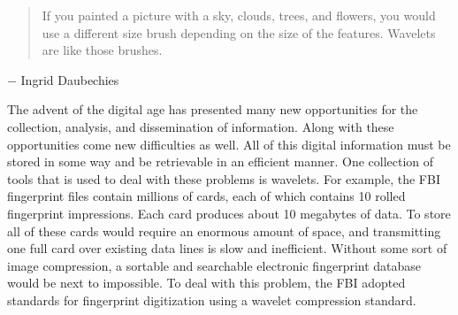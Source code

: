  \label{sec:bases}

\vspace*{-17 pt}

\vspace*{13 pt}


\begin{quote} If you painted a picture with a sky, clouds, trees, and flowers, you would use a different size brush depending on the size of the features. Wavelets are like those brushes.
\end{quote}
\vspace{-0.20in} 
\hspace{0.35in} $-$ Ingrid Daubechies

The advent of the digital age has presented many new opportunities for the collection, analysis,  and dissemination of information. Along with these opportunities come new difficulties as well. All of this digital information must be stored in some way and be retrievable in an efficient manner. One collection of tools that is used to deal with these problems is wavelets. For example, the FBI fingerprint files contain millions of cards, each of which contains 10 rolled fingerprint impressions. Each card produces about 10 megabytes of data. To store all of these cards would require an enormous amount of space, and transmitting one full card over existing data lines is slow and inefficient. Without some sort of image compression, a sortable and searchable electronic fingerprint database would be next to impossible. To deal with this problem, the FBI adopted standards for fingerprint digitization using a wavelet compression standard. 

